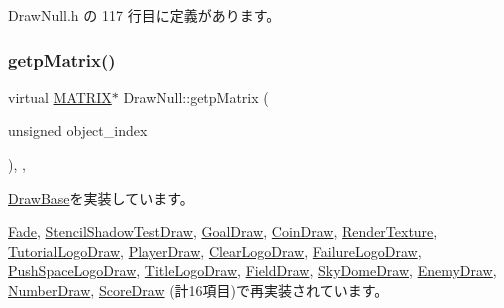  Draw\+Null.\+h の 117 行目に定義があります。

\mbox{\label{class_draw_null_a001901c340671106a33d44b9d4aef4c4}} 
\subsubsection{\texorpdfstring{getp\+Matrix()}{getpMatrix()}}
{\footnotesize\ttfamily virtual \mbox{\hyperlink{_vector3_d_8h_a032295cd9fb1b711757c90667278e744}{M\+A\+T\+R\+IX}}$\ast$ Draw\+Null\+::getp\+Matrix (\begin{DoxyParamCaption}\item[{unsigned}]{object\+\_\+index }\end{DoxyParamCaption})\hspace{0.3cm}{\ttfamily [inline]}, {\ttfamily [override]}, {\ttfamily [virtual]}}



\mbox{\hyperlink{class_draw_base_a60fc3148b2679e4ea7723d2af0c37283}{Draw\+Base}}を実装しています。



\mbox{\hyperlink{class_fade_a2e41a31f9801476e63d2082804375e96}{Fade}}, \mbox{\hyperlink{class_stencil_shadow_test_draw_a8ab105b75d673adc52698a8401c6525c}{Stencil\+Shadow\+Test\+Draw}}, \mbox{\hyperlink{class_goal_draw_a536a23c043576f9032e6651d7644d038}{Goal\+Draw}}, \mbox{\hyperlink{class_coin_draw_ad8cbbe87f4cf4428214f50492c731f5f}{Coin\+Draw}}, \mbox{\hyperlink{class_render_texture_adafb7e9aeea3c298cbfcc71e35ed9457}{Render\+Texture}}, \mbox{\hyperlink{class_tutorial_logo_draw_aade531190180c385c266f5698f99735d}{Tutorial\+Logo\+Draw}}, \mbox{\hyperlink{class_player_draw_a334e94f368f6bd571da866d69333f313}{Player\+Draw}}, \mbox{\hyperlink{class_clear_logo_draw_abcbd0cd8663e0262bcdd83356516082b}{Clear\+Logo\+Draw}}, \mbox{\hyperlink{class_failure_logo_draw_a6e6fb80dc21af9318d659bc3fa71c0b5}{Failure\+Logo\+Draw}}, \mbox{\hyperlink{class_push_space_logo_draw_a9e0875967651293ef97713477334bc2e}{Push\+Space\+Logo\+Draw}}, \mbox{\hyperlink{class_title_logo_draw_a34fa4366f1ff190a08a36f8e402f6941}{Title\+Logo\+Draw}}, \mbox{\hyperlink{class_field_draw_ad399978201f737f4c0dd2b3990fa6b34}{Field\+Draw}}, \mbox{\hyperlink{class_sky_dome_draw_accbc05d1bbde9ad9d6b7180d91e9ed89}{Sky\+Dome\+Draw}}, \mbox{\hyperlink{class_enemy_draw_afbb8ac19041abda280ece7737103dc66}{Enemy\+Draw}}, \mbox{\hyperlink{class_number_draw_a2ea44b362c3a018faf46905d0f755410}{Number\+Draw}}, \mbox{\hyperlink{class_score_draw_adb995c83624c2eab8b8a15d1182df5b8}{Score\+Draw}} (計16項目)で再実装されています。



